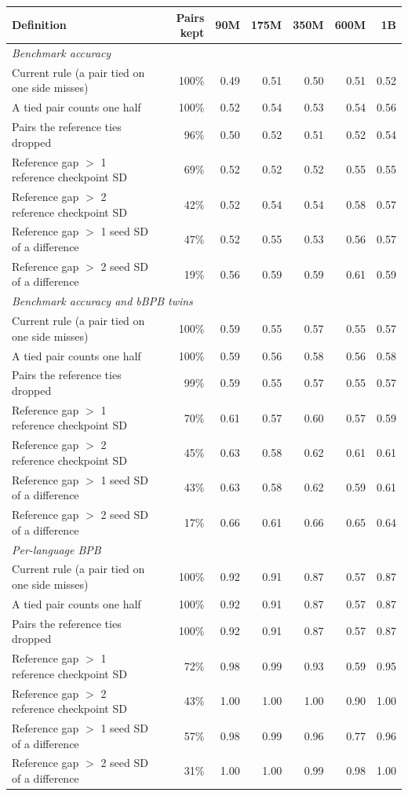 \begin{tabular}{lrrrrrr}
\toprule
Definition & Pairs kept & 90M & 175M & 350M & 600M & 1B \\
\midrule
\multicolumn{7}{l}{\textit{Benchmark accuracy}} \\
Current rule (a pair tied on one side misses) & 100\% & 0.49 & 0.51 & 0.50 & 0.51 & 0.52 \\
A tied pair counts one half & 100\% & 0.52 & 0.54 & 0.53 & 0.54 & 0.56 \\
Pairs the reference ties dropped & 96\% & 0.50 & 0.52 & 0.51 & 0.52 & 0.54 \\
Reference gap $>$ 1 reference checkpoint SD & 69\% & 0.52 & 0.52 & 0.52 & 0.55 & 0.55 \\
Reference gap $>$ 2 reference checkpoint SD & 42\% & 0.52 & 0.54 & 0.54 & 0.58 & 0.57 \\
Reference gap $>$ 1 seed SD of a difference & 47\% & 0.52 & 0.55 & 0.53 & 0.56 & 0.57 \\
Reference gap $>$ 2 seed SD of a difference & 19\% & 0.56 & 0.59 & 0.59 & 0.61 & 0.59 \\
\midrule
\multicolumn{7}{l}{\textit{Benchmark accuracy and bBPB twins}} \\
Current rule (a pair tied on one side misses) & 100\% & 0.59 & 0.55 & 0.57 & 0.55 & 0.57 \\
A tied pair counts one half & 100\% & 0.59 & 0.56 & 0.58 & 0.56 & 0.58 \\
Pairs the reference ties dropped & 99\% & 0.59 & 0.55 & 0.57 & 0.55 & 0.57 \\
Reference gap $>$ 1 reference checkpoint SD & 70\% & 0.61 & 0.57 & 0.60 & 0.57 & 0.59 \\
Reference gap $>$ 2 reference checkpoint SD & 45\% & 0.63 & 0.58 & 0.62 & 0.61 & 0.61 \\
Reference gap $>$ 1 seed SD of a difference & 43\% & 0.63 & 0.58 & 0.62 & 0.59 & 0.61 \\
Reference gap $>$ 2 seed SD of a difference & 17\% & 0.66 & 0.61 & 0.66 & 0.65 & 0.64 \\
\midrule
\multicolumn{7}{l}{\textit{Per-language BPB}} \\
Current rule (a pair tied on one side misses) & 100\% & 0.92 & 0.91 & 0.87 & 0.57 & 0.87 \\
A tied pair counts one half & 100\% & 0.92 & 0.91 & 0.87 & 0.57 & 0.87 \\
Pairs the reference ties dropped & 100\% & 0.92 & 0.91 & 0.87 & 0.57 & 0.87 \\
Reference gap $>$ 1 reference checkpoint SD & 72\% & 0.98 & 0.99 & 0.93 & 0.59 & 0.95 \\
Reference gap $>$ 2 reference checkpoint SD & 43\% & 1.00 & 1.00 & 1.00 & 0.90 & 1.00 \\
Reference gap $>$ 1 seed SD of a difference & 57\% & 0.98 & 0.99 & 0.96 & 0.77 & 0.96 \\
Reference gap $>$ 2 seed SD of a difference & 31\% & 1.00 & 1.00 & 0.99 & 0.98 & 1.00 \\
\bottomrule
\end{tabular}
